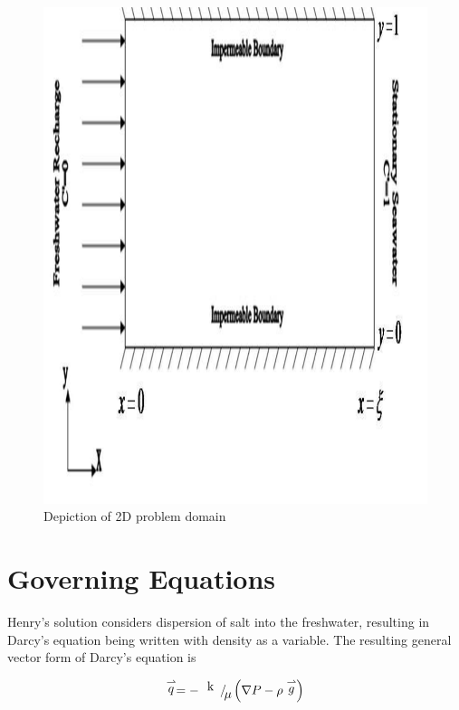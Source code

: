 \documentclass{article}
\newcommand{\spbox}[1]{ \text{ #1 }} %
\begin{document}
\begin{figure}[htp]
    \centering
    \includegraphics[totalheight=0.45 \textheight,viewport=3mm 4mm 205mm 292mm]
    {image1}
    \caption{Depiction of 2D problem domain} \label{fig:Domain}
\end{figure}

\section{Governing Equations}

Henry's solution considers dispersion of salt into the freshwater, resulting in
Darcy's equation being written with density as a variable. The resulting general
vector form of Darcy's equation is

\begin{equation} \label{ZEqnNum283874}
    \stackrel{\rightharpoonup}{q}=-{\raise0.7ex\hbox{\spbox{k} } \!\mathord{\left/
    {\vphantom {k \mu }} \right. \kern-\nulldelimiterspace} \!\lower0.7ex\hbox{$ \mu
    $}} \left(\nabla P-\rho \stackrel{\rightharpoonup}{g} \right) 
\end{equation} 
\end{document}
